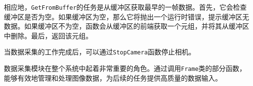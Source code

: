 \par 相应地，\texttt{GetFromBuffer}的任务是从缓冲区获取最早的一帧数据。首先，它会检查缓冲区是否为空。如果缓冲区为空，那么它将抛出一个运行时错误，提示缓冲区无数据。如果缓冲区不为空，函数会从缓冲区的前端获取一个元组，并将其从缓冲区中删除。最后，返回该元组。


\par 当数据采集的工作完成后，可以通过\texttt{StopCamera}函数停止相机。

\par 数据采集模块在整个系统中起着非常重要的角色。通过调用\texttt{Frame}类的部分函数，能够有效地管理和处理图像数据，为后续的任务提供高质量的数据输入。